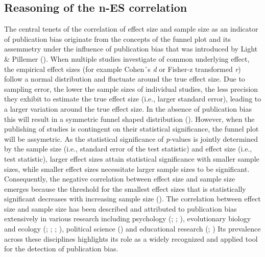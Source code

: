 \documentclass[
  12pt,
]{scrartcl}
\begin{document}
\subsection{Reasoning of the n-ES
correlation}\label{reasoning-of-the-n-es-correlation}

The central tenets of the correlation of effect size and sample size as
an indicator of publication bias originate from the concepts of the
funnel plot and its assemmetry under the influence of publication bias
that was introduced by Light \& Pillemer
(). When multiple studies
investigate of common underlying effect, the empirical effect sizes (for
example Cohen´s \emph{d} or Fisher-z transformed \emph{r}) follow a
normal distribution and fluctuate around the true effect size. Due to
sampling error, the lower the sample sizes of individual studies, the
less precision they exhibit to estimate the true effect size (i.e.,
larger standard error), leading to a larger variation around the true
effect size. In the absence of publication bias this will result in a
symmetric funnel shaped distribution
(). However,
when the publishing of studies is contingent on their statistical
significance, the funnel plot will be assymetric. As the statistical
significance of \emph{p}-values is jointly determined by the sample size
(i.e., standard error of the test statistic) and effect size (i.e., test
statistic), larger effect sizes attain statistical significance with
smaller sample sizes, while smaller effect sizes necessitate larger
sample sizes to be significant. Consequently, the negative correlation
between effect size and sample size emerges because the threshold for
the smallest effect sizes that is statistically significant decreases
with increasing sample size (). The correlation between effect size and sample
size has been described and attributed to publication bias extensively
in various research including psychology
(;
;
), evolutionary
biology and ecology (; ; ; ), political
science () and
educational research (; ) Its prevalence across these disciplines highlights its
role as a widely recognized and applied tool for the detection of
publication bias.
\end{document}
